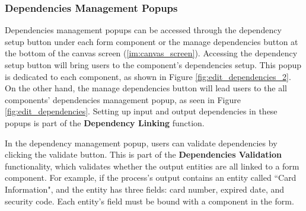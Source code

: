 

\subsubsection{Dependencies Management Popups}
\label{im:depend_manage_pop}

Dependencies management popups can be accessed through the dependency setup button under each form component or the manage dependencies button at the bottom of the canvas screen (\ref{im:canvas_screen}). Accessing the dependency setup button will bring users to the component's dependencies setup. This popup is dedicated to each component, as shown in Figure \ref{fig:edit_dependencies_2}. On the other hand, the manage dependencies button will lead users to the all components' dependencies management popup, as seen in Figure \ref{fig:edit_dependencies}. Setting up input and output dependencies in these popups is part of the \textbf{Dependency Linking} function.


In the dependency management popup, users can validate dependencies by clicking the validate button. This is part of the \textbf{Dependencies Validation} functionality, which validates whether the output entities are all linked to a form component. For example, if the process's output contains an entity called ``Card Information", and the entity has three fields: card number, expired date, and security code. Each entity's field must be bound with a component in the form.

